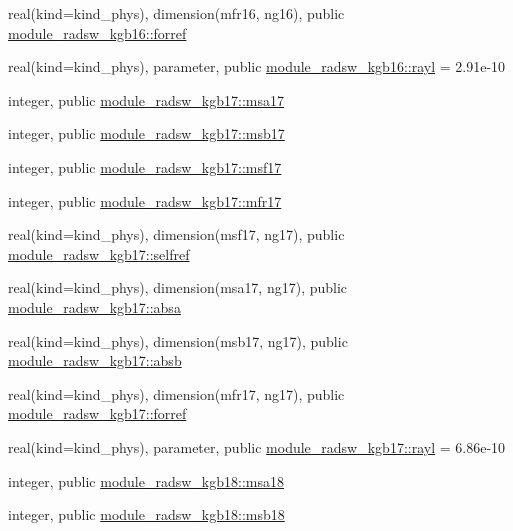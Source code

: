 \begin{DoxyCompactItemize}
\item 
real(kind=kind\+\_\+phys), dimension(mfr16, ng16), public \hyperlink{group__module__radsw__main_ga8e8cf110f56c7d4253c63bbf607be34c}{module\+\_\+radsw\+\_\+kgb16\+::forref}
\item 
real(kind=kind\+\_\+phys), parameter, public \hyperlink{group__module__radsw__main_ga27964e0300eb686acf1ed3c8459d3810}{module\+\_\+radsw\+\_\+kgb16\+::rayl} = 2.\+91e-\/10
\item 
integer, public \hyperlink{namespacemodule__radsw__kgb17_ac139ff93555c22e658cb767fa7142e08}{module\+\_\+radsw\+\_\+kgb17\+::msa17}
\item 
integer, public \hyperlink{group__module__radsw__main_gafbb056103147b8e5f4d5a8af40420ea0}{module\+\_\+radsw\+\_\+kgb17\+::msb17}
\item 
integer, public \hyperlink{group__module__radsw__main_ga6864c3b95515fb2f408e21298da3952f}{module\+\_\+radsw\+\_\+kgb17\+::msf17}
\item 
integer, public \hyperlink{group__module__radsw__main_gadd099d7e1b5e7767d77de6d96673e26f}{module\+\_\+radsw\+\_\+kgb17\+::mfr17}
\item 
real(kind=kind\+\_\+phys), dimension(msf17, ng17), public \hyperlink{group__module__radsw__main_gaade34dfbe8c5f380088b6e03acc727c9}{module\+\_\+radsw\+\_\+kgb17\+::selfref}
\item 
real(kind=kind\+\_\+phys), dimension(msa17, ng17), public \hyperlink{group__module__radsw__main_ga19083764c3dfe437282b032517baf3ed}{module\+\_\+radsw\+\_\+kgb17\+::absa}
\item 
real(kind=kind\+\_\+phys), dimension(msb17, ng17), public \hyperlink{group__module__radsw__main_gaef407d13a88f5e1bfd20652ab3010e2f}{module\+\_\+radsw\+\_\+kgb17\+::absb}
\item 
real(kind=kind\+\_\+phys), dimension(mfr17, ng17), public \hyperlink{group__module__radsw__main_ga5041a137ba35dca9a767ce854748dd49}{module\+\_\+radsw\+\_\+kgb17\+::forref}
\item 
real(kind=kind\+\_\+phys), parameter, public \hyperlink{group__module__radsw__main_gaa4862628a06e0e08d1db5637bc62ffa5}{module\+\_\+radsw\+\_\+kgb17\+::rayl} = 6.\+86e-\/10
\item 
integer, public \hyperlink{namespacemodule__radsw__kgb18_a48213008c9ed8f94aaad4ef327d38583}{module\+\_\+radsw\+\_\+kgb18\+::msa18}
\item 
integer, public \hyperlink{group__module__radsw__main_gad2e52d9beb90328236a351926d1a3432}{module\+\_\+radsw\+\_\+kgb18\+::msb18}
\item 

\end{DoxyCompactItemize}
